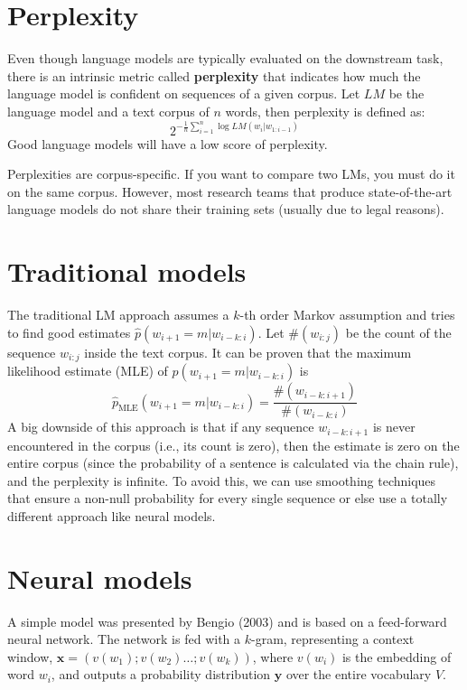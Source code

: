 \section{Perplexity}
Even though language models are typically evaluated on the downstream task, there is an intrinsic metric called \textbf{perplexity} that indicates how much the language model is confident on sequences of a given corpus. Let $LM$ be the language model and a text corpus of $n$ words, then perplexity is defined as:
$$
2^{-\frac{1}{n}\sum_{i=1}^{n}\log LM(w_{i}|w_{1:i-1})}
$$
Good language models will have a low score of perplexity.

\begin{note}{}
    Perplexities are corpus-specific. If you want to compare two LMs, you must do it on the same corpus.
    However, most research teams that produce state-of-the-art language models do not share their training sets (usually due to legal reasons).
\end{note}

\section{Traditional models}
The traditional LM approach assumes a $k$-th order Markov assumption and tries to find good estimates $\hat{p}(w_{i+1}=m|w_{i-k:i})$. Let $\#(w_{i:j})$ be the count of the sequence $w_{i:j}$ inside the text corpus. It can be proven that the maximum likelihood estimate (MLE) of $\hat{p}(w_{i+1}=m|w_{i-k:i})$ is
$$
\hat{p}_{\text{MLE}}(w_{i+1}=m|w_{i-k:i}) = \frac{\#(w_{i-k:i+1})}{\#(w_{i-k:i})}
$$
A big downside of this approach is that if any sequence $w_{i-k:i+1}$ is never encountered in the corpus (i.e., its count is zero), then the estimate is zero on the entire corpus (since the probability of a sentence is calculated via the chain rule), and the perplexity is infinite. To avoid this, we can use smoothing techniques that ensure a non-null probability for every single sequence or else use a totally different approach like neural models.

\section{Neural models}
A simple model was presented by Bengio (2003) and is based on a feed-forward neural network. The network is fed with a $k$-gram, representing a context window, $\mathbf{x} = (v(w_{1}); v(w_{2}) \dots; v(w_{k}))$, where $v(w_{i})$ is the embedding of word $w_{i}$, and outputs a probability distribution $\mathbf{y}$ over the entire vocabulary $V$.

